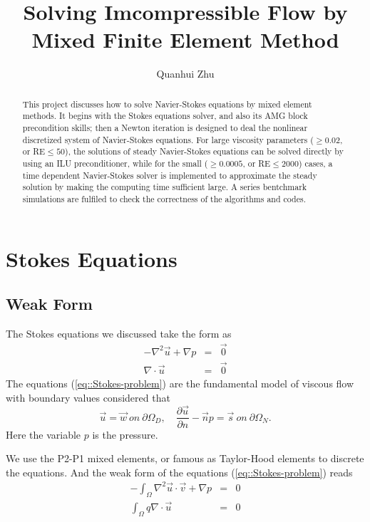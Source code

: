 \documentclass[a4paper]{article}
\title{Solving Imcompressible Flow by Mixed Finite Element Method}
\author{Quanhui Zhu}
\begin{document}
\maketitle

\begin{abstract}
  This project discusses how to solve Navier-Stokes equations by mixed
  element methods. It begins with the Stokes equations solver, and
  also its AMG block precondition skills; then a Newton iteration is
  designed to deal the nonlinear discretized system of Navier-Stokes
  equations.  For large viscosity parameters ($\geq 0.02$, or RE$\leq
  50$), the solutions of steady Navier-Stokes equations can be solved
  directly by using an ILU preconditioner, while for the small ($\geq
  0.0005$, or RE$\leq 2000$) cases, a time dependent Navier-Stokes
  solver is implemented to approximate the steady solution by making
  the computing time sufficient large. A series bentchmark simulations
  are fulfiled to check the correctness of the algorithms and codes.
\end{abstract}


\section{Stokes Equations}

\subsection{Weak Form}

The Stokes equations we discussed take the form as
\begin{equation}
\begin{array}{rcl}
-\nabla^2 \vec{u} + \nabla p &=& \vec{0} \\
\nabla \cdot \vec{u} &=& \vec{0}
\label{eq::Stokes-problem}
\end{array}
\end{equation}
The equations (\ref{eq::Stokes-problem}) are the fundamental model of
viscous flow with boundary values considered that
\begin{equation}
\vec{u} = \vec{w} \ on \ \partial \Omega_D ,\quad \frac{\partial
  \vec{u}}{\partial n} - \vec{n} p = \vec{s} \ on \ \partial \Omega_N.
\end{equation}
Here the variable $p$ is the pressure.

We use the P2-P1 mixed elements, or famous as Taylor-Hood elements
\cite{Lee2005Finite} to discrete the equations. And the weak form of
the equations (\ref{eq::Stokes-problem}) reads
\begin{equation}
\begin{array}{rcl}
-\int_\Omega \nabla^2 \vec{u} \cdot \vec{v} + \nabla p &=& 0\\
\int_\Omega q\nabla \cdot \vec{u} &=&0
\label{eq::Stokes-weakform}
\end{array}
\end{equation}
\end{document}
